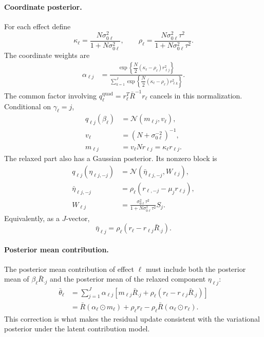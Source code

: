 \documentclass[11pt]{article}
\begin{document}
\paragraph{Coordinate posterior.}
For each effect define
\[
\kappa_\ell=\frac{N\sigma_{0\ell}^2}{1+N\sigma_{0\ell}^2},
\qquad
\rho_\ell=\frac{N\sigma_{0\ell}^2\tau^2}{1+N\sigma_{0\ell}^2\tau^2}.
\]
The coordinate weights are
\begin{align}
\alpha_{\ell j}
&=
\frac{\exp\!\left\{\dfrac{N}{2}(\kappa_\ell-\rho_\ell)r_{\ell j}^2\right\}}
{\sum_{k=1}^J
\exp\!\left\{\dfrac{N}{2}(\kappa_\ell-\rho_\ell)r_{\ell k}^2\right\}}.
\end{align}
The common factor involving
$q_\ell^{\mathrm{quad}}=r_\ell^T\bar R^{-1}r_\ell$ cancels in this
normalization. Conditional on $\gamma_\ell=j$,
\begin{align}
q_{\ell j}(\beta_\ell)
&=
\mathcal N(m_{\ell j},v_\ell),\\
v_\ell&=\left(N+\sigma_{0\ell}^{-2}\right)^{-1},\\
m_{\ell j}&=v_\ell N r_{\ell j}
=\kappa_\ell r_{\ell j}.
\end{align}
The relaxed part also has a Gaussian posterior. Its nonzero block is
\begin{align}
q_{\ell j}(\eta_{\ell j,-j})
&=
\mathcal N(\bar\eta_{\ell j,-j},W_{\ell j}),\\
\bar\eta_{\ell j,-j}
&=
\rho_\ell(r_{\ell,-j}-\mu_jr_{\ell j}),\\
W_{\ell j}
&=
\frac{\sigma_{0\ell}^2\tau^2}{1+N\sigma_{0\ell}^2\tau^2}S_j.
\end{align}
Equivalently, as a $J$-vector,
\[
\bar\eta_{\ell j}
=
\rho_\ell(r_\ell-r_{\ell j}\bar R_{\cdot j}).
\]

\paragraph{Posterior mean contribution.}
The posterior mean contribution of effect $\ell$ must include both the
posterior mean of $\beta_\ell\bar R_{\cdot j}$ and the posterior mean of the
relaxed component $\eta_{\ell j}$:
\begin{align}
\bar\theta_\ell
&=
\sum_{j=1}^J
\alpha_{\ell j}
\left[
m_{\ell j}\bar R_{\cdot j}
+\rho_\ell(r_\ell-r_{\ell j}\bar R_{\cdot j})
\right] \nonumber\\
&=
\bar R(\alpha_\ell\odot m_\ell)
+\rho_\ell r_\ell
-\rho_\ell\bar R(\alpha_\ell\odot r_\ell).
\end{align}
This correction is what makes the residual update consistent with the
variational posterior under the latent contribution model.
\end{document}
